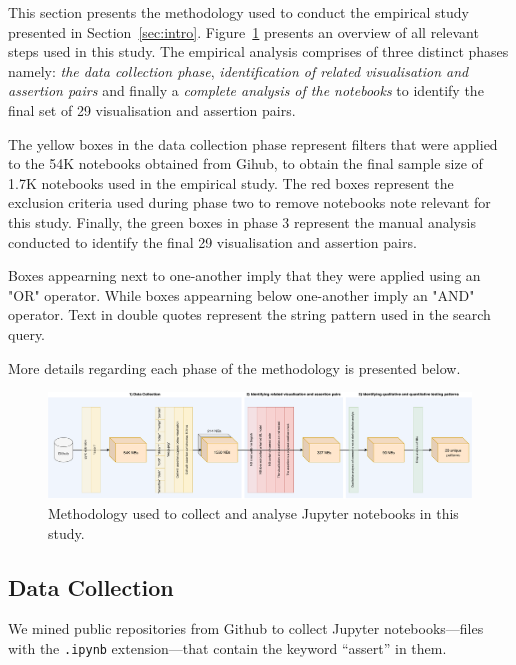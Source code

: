 \documentclass[acmsmall,screen,review,anonymous]{acmart}
\begin{document}
This section presents the methodology used to conduct the empirical
study presented in Section~\ref{sec:intro}. Figure~\ref{fig:method}
presents an overview of all relevant steps used in this study. The
empirical analysis comprises of three distinct phases namely:
\textit{the data collection phase}, \textit{identification of related
visualisation and assertion pairs} and finally a \textit{complete
analysis of the notebooks} to identify the final set of 29
visualisation and assertion pairs.

The yellow boxes in the data collection phase represent filters that
were applied to the 54K notebooks obtained from Gihub, to obtain the
final sample size of 1.7K notebooks used in the empirical study. The red
boxes represent the exclusion criteria used during phase two to remove
notebooks note relevant for this study. Finally, the green boxes in
phase 3 represent the manual analysis conducted to identify the final 29
visualisation and assertion pairs.

Boxes appearning next to one-another imply that they were applied
using an "OR" operator. While boxes appearning below one-another imply
an "AND" operator. Text in double quotes represent the string pattern
used in the search query.

More details regarding each phase of the methodology is presented below.

\begin{figure}
  \centering
  \includegraphics[width=\textwidth]{method.pdf}
  \caption{Methodology used to collect and analyse Jupyter notebooks
    in this study.}
  \label{fig:method}
\end{figure}

\subsection{Data Collection}\label{sec:data-collect}

We mined public repositories from Github to collect Jupyter
notebooks---files with the \texttt{.ipynb} extension---that contain
the keyword ``assert'' in them.

\end{document}
